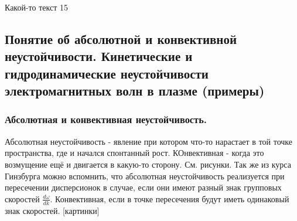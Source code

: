 \documentclass[10pt, a4paper]{article}
\begin{document}
Какой-то текст 15

\subsection{Понятие об абсолютной и конвективной неустойчивости. Кинетические и гидродинамические неустойчивости электромагнитных волн в плазме (примеры)}

\subsubsection{Абсолютная и конвективная неустойчивость.}
Абсолютная неустойчивость - явление при котором что-то нарастает в той точке пространства, где и начался спонтанный рост. КОнвективная - когда это возмущение ещё и двигается в какую-то сторону. См. рисунки. Так же из курса Гинзбурга можно вспомнить, что абсолютная неустойчивость реализуется при пересечении дисперсионок в случае, если они имеют разный знак групповых скоростей $\frac {d\omega}{dk}$. Конвективная, если в точке пересечения будут иметь одинаковый знак скоростей.
[картинки]
\end{document}

